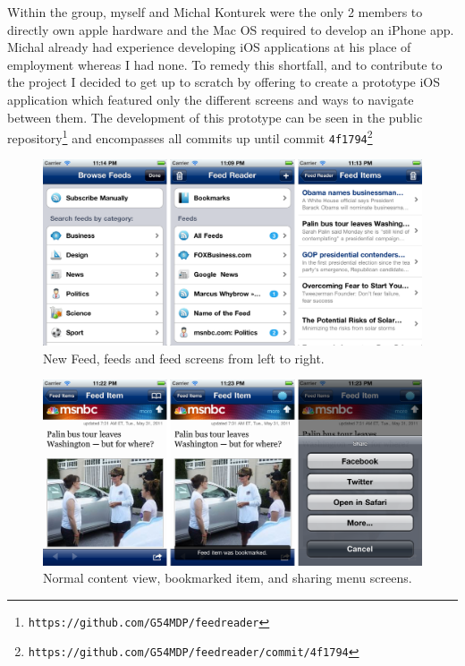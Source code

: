 \documentclass[a4paper,11pt]{article}
\begin{document}
	Within the group, myself and Michal Konturek were the only 2 members to directly own apple hardware and the Mac OS required to develop an iPhone app. Michal already had experience developing iOS applications at his place of employment whereas I had none. To remedy this shortfall, and to contribute to the project I decided to get up to scratch by offering to create a prototype iOS application which featured only the different screens and ways to navigate between them. The development of this prototype can be seen in the public repository\footnote{\texttt{https://github.com/G54MDP/feedreader}} and encompasses all commits up until commit \verb!4f1794!\footnote{\texttt{https://github.com/G54MDP/feedreader/commit/4f1794}}
	
	\begin{figure}[t]
		\centering
		\includegraphics[width=12.65cm]{images/screens1.png}
		\caption{New Feed, feeds and feed screens from left to right.}
		\label{screens1}
	\end{figure}
	
	\begin{figure}[t]
		\centering
		\includegraphics[width=12.65cm]{images/screens2.png}
		\caption{Normal content view, bookmarked item, and sharing menu screens.}
		\label{screens2}
	\end{figure}
	
\end{document}
